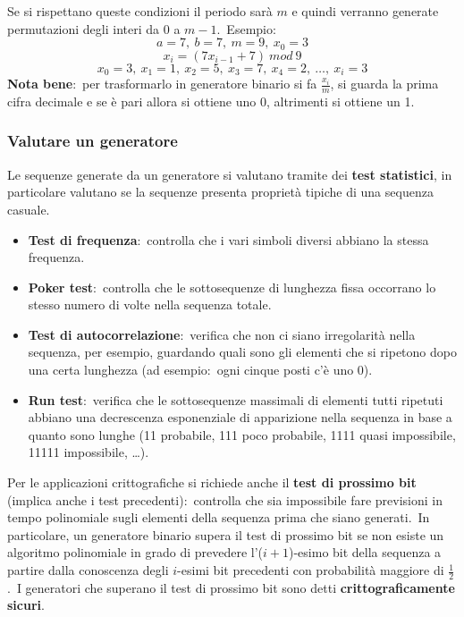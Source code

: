 \noindent Se si rispettano queste condizioni il periodo sarà $m$ e quindi verranno generate permutazioni degli interi da $0$ a $m-1$.\
Esempio:
\[a = 7,\ b = 7,\ m = 9,\ x_0 = 3\]
\[x_i = (7x_{i-1} + 7)\ \mathit{mod}\ 9\]
\[x_0 = 3,\ x_1 = 1,\ x_2 = 5,\ x_3 = 7,\ x_4 = 2,\ \dots,\ x_i=3 \]
\textbf{Nota bene}:\ per trasformarlo in generatore binario si fa $\frac{x_i}{m}$, si guarda la prima cifra decimale e se è pari allora si ottiene uno 0, altrimenti si ottiene un 1.

\subsubsection{Valutare un generatore}

Le sequenze generate da un generatore si valutano tramite dei \textbf{test statistici}, in particolare valutano se la sequenze presenta proprietà tipiche di una sequenza casuale.\

\begin{itemize}
    \item \textbf{Test di frequenza}:\ controlla che i vari simboli diversi abbiano la stessa frequenza.
    \item \textbf{Poker test}:\ controlla che le sottosequenze di lunghezza fissa occorrano lo stesso numero di volte nella sequenza totale.
    \item \textbf{Test di autocorrelazione}:\ verifica che non ci siano irregolarità nella sequenza, per esempio, guardando quali sono gli elementi che si ripetono dopo una certa lunghezza (ad esempio:\ ogni cinque posti c'è uno 0).
    \item \textbf{Run test}:\ verifica che le sottosequenze massimali di elementi tutti ripetuti abbiano una decrescenza esponenziale di apparizione nella sequenza in base a quanto sono lunghe (11 probabile, 111 poco probabile, 1111 quasi impossibile, 11111 impossibile, \dots).
\end{itemize}

\noindent Per le applicazioni crittografiche si richiede anche il \textbf{test di prossimo bit} (implica anche i test precedenti):\ controlla che sia impossibile fare previsioni in tempo polinomiale sugli elementi della sequenza prima che siano generati.\
In particolare, un generatore binario supera il test di prossimo bit se non esiste un algoritmo polinomiale in grado di prevedere l'($i+1$)-esimo bit della sequenza a partire dalla conoscenza degli $i$-esimi bit precedenti con probabilità maggiore di $\frac{1}{2}$.\
I generatori che superano il test di prossimo bit sono detti \textbf{crittograficamente sicuri}.\

